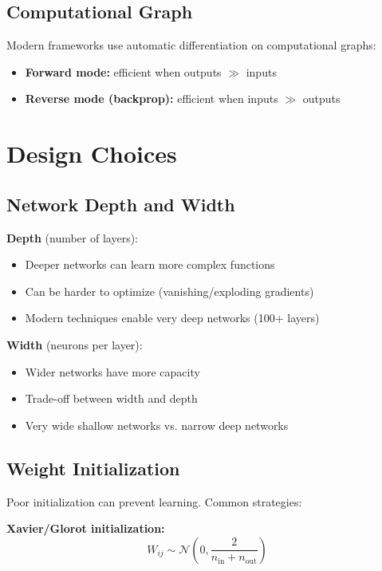 \subsection{Computational Graph}

Modern frameworks use automatic differentiation on computational graphs:
\begin{itemize}
    \item \textbf{Forward mode:} efficient when outputs $\gg$ inputs
    \item \textbf{Reverse mode (backprop):} efficient when inputs $\gg$ outputs
\end{itemize}

\section{Design Choices}
\label{sec:design-choices}

\subsection{Network Depth and Width}

\textbf{Depth} (number of layers):
\begin{itemize}
    \item Deeper networks can learn more complex functions
    \item Can be harder to optimize (vanishing/exploding gradients)
    \item Modern techniques enable very deep networks (100+ layers)
\end{itemize}

\textbf{Width} (neurons per layer):
\begin{itemize}
    \item Wider networks have more capacity
    \item Trade-off between width and depth
    \item Very wide shallow networks vs. narrow deep networks
\end{itemize}

\subsection{Weight Initialization}

Poor initialization can prevent learning. Common strategies:

\textbf{Xavier/Glorot initialization:}
\begin{equation}
W_{ij} \sim \mathcal{N}\left(0, \frac{2}{n_{\text{in}} + n_{\text{out}}}\right)
\end{equation}

